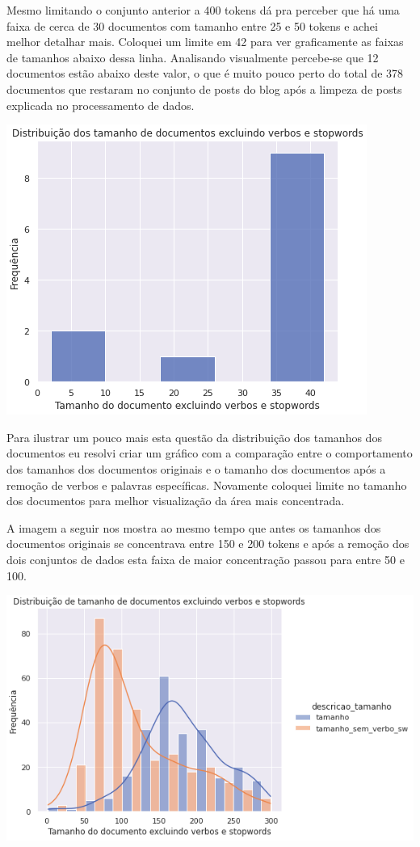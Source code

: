 Mesmo limitando o conjunto anterior a 400 tokens dá pra perceber que há uma faixa de cerca de 30 documentos com tamanho entre 25 
e 50 tokens e achei melhor detalhar mais. Coloquei um limite em 42 para ver graficamente as faixas de tamanhos abaixo dessa linha.
Analisando visualmente percebe-se que 12 documentos estão abaixo deste valor, o que é muito pouco perto do total de 378 documentos 
que restaram no conjunto de posts do blog após a limpeza de posts explicada no processamento de dados.

\includegraphics[scale=0.75]{explore/resources/tamanho_documentos_nao_verbo_sw_max42.png}

Para ilustrar um pouco mais esta questão da distribuição dos tamanhos dos documentos eu resolvi criar um gráfico com a comparação entre 
o comportamento dos tamanhos dos documentos originais e o tamanho dos documentos após a remoção de verbos e palavras específicas. Novamente
coloquei limite no tamanho dos documentos para melhor visualização da área mais concentrada.

A imagem a seguir nos mostra ao mesmo tempo que antes os tamanhos dos documentos originais se concentrava entre 150 e 200 tokens e após
a remoção dos dois conjuntos de dados esta faixa de maior concentração passou para entre 50 e 100.

\includegraphics[scale=0.75]{explore/resources/comparacao_distribuicao_tamanhos_kde.png}


